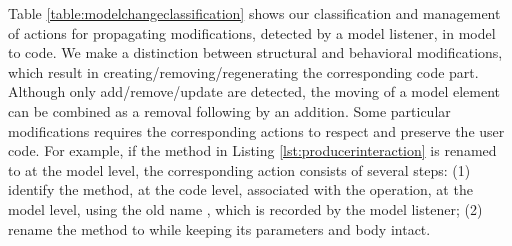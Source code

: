 \vskip 0.2cm
\noindent
{}
Table \ref{table:modelchangeclassification} shows our classification and management of actions for propagating modifications, detected by a model listener, in model to code.
We make a distinction between structural and behavioral modifications, which result in creating/removing/regenerating the corresponding code part.
Although only add/remove/update are detected, the moving of a model element can be combined as a removal following by an addition.  
Some particular modifications requires the corresponding actions to respect and preserve the user code.
For example, if the  method in Listing \ref{lst:producerinteraction} is renamed to  at the model level, the corresponding action consists of several steps: (1) identify the method, at the code level, associated with the operation, at the model level, using the old name , which is recorded by the model listener;
(2) rename the method to  while keeping its parameters and body intact. 



